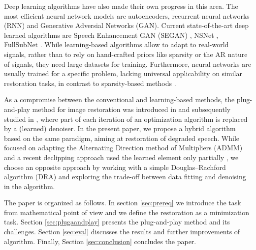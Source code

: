 \documentclass[conference]{IEEEtran}
\begin{document}
Deep learning algorithms have also made their own progress in this area.
The most efficient neural network models are autoencoders,
recurrent neural networks (RNN) and
Generative Adversial Networks (GAN).
Current state-of-the-art deep learned algorithms are Speech Enhancement GAN (SEGAN) \cite{Pascual2017}, NSNet \cite{Xia2020}, FullSubNet \cite{Hao2021}.
While learning-based algorithms allow to adapt to real-world signals, rather than to rely on hand-crafted priors like sparsity or the AR nature of signals, they need large datasets for training.
Furthermore, neural networks are usually trained for a specific problem, lacking universal applicability on similar restoration tasks, in contrast to sparsity-based methods \cite{Gaultier2017, Mokry202021, Zaviska2021}.

As a compromise between the conventional and learning-based methods, 
the plug-and-play method for image restoration was introduced in \cite{Venkatakrishnan2013} and subsequently studied in \cite{Chan2016},
where part of each iteration of an optimization algorithm is replaced by a (learned) denoiser.
In the present paper, we propose a hybrid algorithm based on the same paradigm, aiming at restoration of degraded speech.
While \cite{Chan2016} focused on adapting the Alternating Direction method of Multipliers (ADMM) and a recent declipping approach used the learned element only partially \cite{Tanaka2022}, we choose an opposite approach by working with a simple Douglas--Rachford algorithm (DRA) and exploring the trade-off between data fitting and denoising in the algorithm.



The paper is organized as follows. In section \ref{sec:prereq} we introduce the task from mathematical point of view and we define the restoration as a minimization task.
Section \ref{sec:plugaandplay} presents the plug-and-play method and its challenges.
Section \ref{sec:eval} discusses the results and further improvements of algorithm.
Finally, Section \ref{sec:conclusion} concludes the paper.
\end{document}

